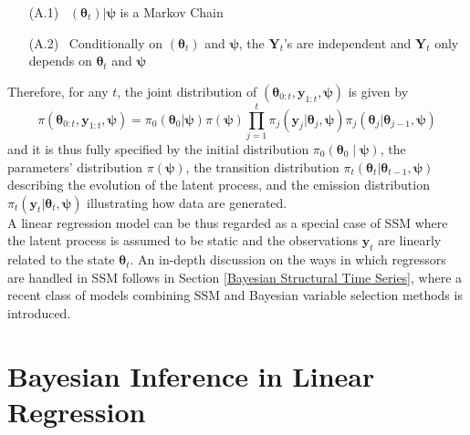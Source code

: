 \documentclass[
  12pt,
]{book}
\theoremstyle{break}
\theoremstyle{nonumberplain}
\begin{document}
\begin{itemize}
\item[(A.1)]\ $(\boldsymbol{\theta}_{t})|\boldsymbol{\psi}$ is a Markov Chain
\item[(A.2)] \ Conditionally on $(\boldsymbol{\theta}_{t})$ and $\boldsymbol{\psi}$, the $\boldsymbol{Y}_{t}$'s are independent and $\boldsymbol{Y}_{t}$ only depends on $\boldsymbol{\theta}_{t}$ and $\boldsymbol{\psi}$
\end{itemize}

Therefore, for any \(t\), the joint distribution of
\((\boldsymbol{\theta}_{0:t},\boldsymbol{y}_{1:t},\boldsymbol{\psi})\)
is given by \begin{equation*}
\pi(\boldsymbol{\theta}_{0:t},\boldsymbol{y}_{1:t},\boldsymbol{\psi})=\pi_{0}(\boldsymbol{\theta}_{0}|\boldsymbol{\psi})\pi(\boldsymbol{\psi})\prod_{j=1}^{t}\pi_{j}(\boldsymbol{y}_{j}|\boldsymbol{\theta}_{j},\boldsymbol{\psi})\pi_{j}(\boldsymbol{\theta}_{j}|\boldsymbol{\theta}_{j-1},\boldsymbol{\psi})
\end{equation*} and it is thus fully specified by the initial
distribution \(\pi_{0}(\boldsymbol{\theta}_0\mid\boldsymbol{\psi})\),
the parameters' distribution \(\pi(\boldsymbol{\psi})\), the transition
distribution
\(\pi_{t}(\boldsymbol{\theta}_{t}|\boldsymbol{\theta}_{t-1},\boldsymbol{\psi})\)
describing the evolution of the latent process, and the emission
distribution
\(\pi_{t}(\boldsymbol{y}_{t}|\boldsymbol{\theta}_{t},\boldsymbol{\psi})\)
illustrating how data are generated.\\
A linear regression model can be thus regarded as a special case of SSM
where the latent process is assumed to be static and the observations
\(\boldsymbol{y}_{t}\) are linearly related to the state
\(\boldsymbol{\theta}_{t}\). An in-depth discussion on the ways in which
regressors are handled in SSM follows in Section
\ref{Bayesian Structural Time Series}, where a recent class of models
combining SSM and Bayesian variable selection methods is introduced.

\section{Bayesian Inference in Linear Regression} \label{Bayesian Inference in Linear Regression}
\end{document}
